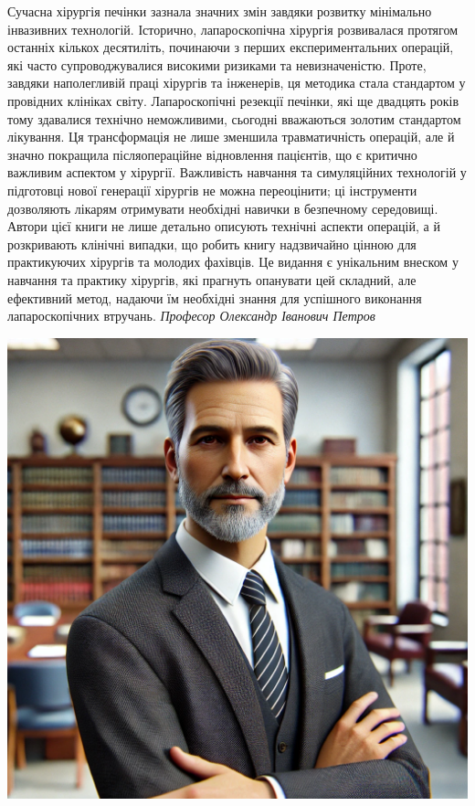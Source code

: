 \newpage

\noindent
\begin{minipage}{0.65\textwidth}
Сучасна хірургія печінки зазнала значних змін завдяки розвитку мінімально інвазивних технологій. Історично, лапароскопічна хірургія розвивалася протягом останніх кількох десятиліть, починаючи з перших експериментальних операцій, які часто супроводжувалися високими ризиками та невизначеністю. Проте, завдяки наполегливій праці хірургів та інженерів, ця методика стала стандартом у провідних клініках світу. Лапароскопічні резекції печінки, які ще двадцять років тому здавалися технічно неможливими, сьогодні вважаються золотим стандартом лікування. Ця трансформація не лише зменшила травматичність операцій, але й значно покращила післяопераційне відновлення пацієнтів, що є критично важливим аспектом у хірургії. Важливість навчання та симуляційних технологій у підготовці нової генерації хірургів не можна переоцінити; ці інструменти дозволяють лікарям отримувати необхідні навички в безпечному середовищі. Автори цієї книги не лише детально описують технічні аспекти операцій, а й розкривають клінічні випадки, що робить книгу надзвичайно цінною для практикуючих хірургів та молодих фахівців. Це видання є унікальним внеском у навчання та практику хірургів, які прагнуть опанувати цей складний, але ефективний метод, надаючи їм необхідні знання для успішного виконання лапароскопічних втручань.  
\vspace{30pt} 
\vfill   
\hfill \textit{Професор Олександр Іванович Петров}
\vfill  
\end{minipage}
\hfill
\begin{minipage}{0.3\textwidth}
    \centering
    \includegraphics[width=\textwidth]{Illustrations/Preface/image1.png}
\end{minipage}

